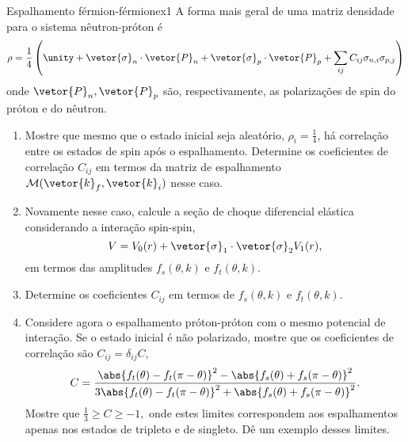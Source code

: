 \begin{exercício}{Espalhamento férmion-férmion}{ex1}
   A forma mais geral de uma matriz densidade para o sistema nêutron-próton é
   \begin{equation*}
      \rho = \frac14 \left(\unity + \vetor{\sigma}_n \cdot \vetor{P}_n + \vetor{\sigma}_p \cdot \vetor{P}_p + \sum_{ij}C_{ij}{\sigma_{n,i}\sigma_{p,j}}\right)
   \end{equation*}
   onde \(\vetor{P}_n,\vetor{P}_p\) são, respectivamente, as polarizações de spin do próton e do nêutron.
   \begin{enumerate}[label=(\alph*)]
      \item Mostre que mesmo que o estado inicial seja aleatório, \(\rho_i = \frac14\), há correlação entre os estados de spin após o espalhamento. Determine os coeficientes de correlação \(C_{ij}\) em termos da matriz de espalhamento \(\mathcal{M}(\vetor{k}_f,\vetor{k}_i)\) nesse caso.
      \item Novamente nesse caso, calcule a seção de choque diferencial elástica considerando a interação spin-spin,
         \begin{equation*}
            V = V_0(r) + \vetor{\sigma}_1 \cdot \vetor{\sigma}_2 V_1(r),
         \end{equation*}
         em termos das amplitudes \(f_{s}(\theta, k)\) e \(f_t(\theta,k).\)
      \item Determine os coeficientes \(C_{ij}\) em termos de \(f_s(\theta,k)\) e \(f_t(\theta,k).\)
      \item Considere agora o espalhamento próton-próton com o mesmo potencial de interação. Se o estado inicial é não polarizado, mostre que os coeficientes de correlação são \(C_{ij} = \delta_{ij} C,\)
         \begin{equation*}
            C = \frac{\abs{f_t(\theta) - f_t(\pi - \theta)}^2 - \abs{f_s(\theta) + f_s(\pi - \theta)}^2}{3 \abs{f_t(\theta) - f_t(\pi - \theta)}^2 + \abs{f_s(\theta) + f_s(\pi - \theta)}^2}.
         \end{equation*}
         Mostre que \(\frac13 \geq C \geq -1,\) onde estes limites correspondem aos espalhamentos apenas nos estados de tripleto e de singleto. Dê um exemplo desses limites.
   \end{enumerate}
\end{exercício}
